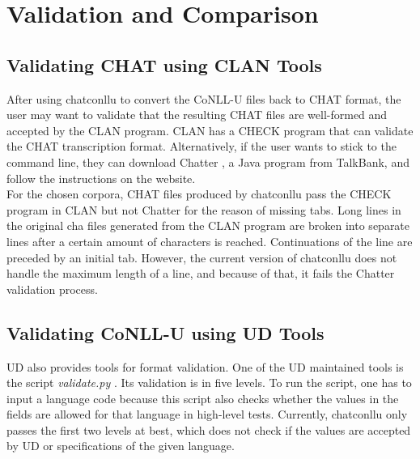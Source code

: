 \chapter{Validation and Comparison} %

\label{Chapter5} %

\section{Validating CHAT using CLAN Tools}

After using chatconllu to convert the CoNLL-U files back to CHAT format, the user may want to validate that the resulting CHAT files are well-formed and accepted by the CLAN program. CLAN has a CHECK program  that can validate the CHAT transcription format. Alternatively, if the user wants to stick to the command line, they can download Chatter , a Java program from TalkBank, and follow the instructions on the website.\\

For the chosen corpora, CHAT files produced by chatconllu pass the CHECK program in CLAN but not Chatter for the reason of missing tabs. Long lines in the original cha files generated from the CLAN program are broken into separate lines after a certain amount of characters is reached. Continuations of the line are preceded by an initial tab. However, the current version of chatconllu does not handle the maximum length of a line, and because of that, it fails the Chatter validation process.
\vspace{-0.4em}
\section{Validating CoNLL-U using UD Tools}

UD also provides tools for format validation. One of the UD maintained tools is the script \emph{validate.py} . Its validation is in five levels. To run the script, one has to input a language code because this script also checks whether the values in the fields are allowed for that language in high-level tests. Currently, chatconllu only passes the first two levels at best, which does not check if the values are accepted by UD or specifications of the given language.
\vspace{-0.4em}
